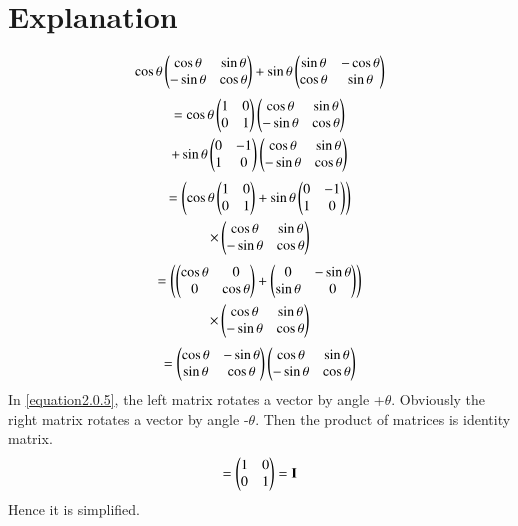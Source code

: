 \documentclass[journal,12pt,twocolumn]{IEEEtran}
\begin{document}
\section{\textbf{Explanation}}
\begin{align}
    \cos\theta\begin{pmatrix}\cos\theta & \sin\theta \\ -\sin\theta & \cos\theta\end{pmatrix}+\sin\theta\begin{pmatrix}\sin\theta & -\cos\theta \\ \cos\theta & \sin\theta\end{pmatrix}
\end{align}
\begin{multline}
    =\cos\theta\begin{pmatrix} 1 & 0 \\ 0 & 1\end{pmatrix}\begin{pmatrix}\cos\theta & \sin\theta \\ -\sin\theta & \cos\theta\end{pmatrix}\\+\sin\theta\begin{pmatrix} 0 & -1 \\ 1 & 0 \end{pmatrix}\begin{pmatrix}\cos\theta & \sin\theta \\ -\sin\theta & \cos\theta\end{pmatrix}
\end{multline}
\begin{multline}
    =\left(\cos\theta\begin{pmatrix} 1 & 0 \\ 0 & 1\end{pmatrix}+\sin\theta\begin{pmatrix} 0 & -1 \\ 1 & 0 \end{pmatrix}\right)\\\times\begin{pmatrix}\cos\theta & \sin\theta \\ -\sin\theta & \cos\theta\end{pmatrix}
\end{multline}
\begin{multline}
    =\left(\begin{pmatrix} \cos\theta & 0 \\ 0 & \cos\theta\end{pmatrix}+\begin{pmatrix} 0 & -\sin\theta \\ \sin\theta & 0 \end{pmatrix}\right)\\\times\begin{pmatrix}\cos\theta & \sin\theta \\ -\sin\theta & \cos\theta\end{pmatrix}
\end{multline}
\begin{align}\label{equation2.0.5}
    =\begin{pmatrix}\cos\theta & -\sin\theta \\ \sin\theta & \cos\theta\end{pmatrix}\begin{pmatrix}\cos\theta & \sin\theta \\ -\sin\theta & \cos\theta\end{pmatrix}
\end{align}
In \eqref{equation2.0.5}, the left matrix rotates a vector by angle +$\theta$. Obviously the right matrix rotates a vector by angle -$\theta$. Then the product of matrices is identity matrix.
\begin{align}
    =\begin{pmatrix} 1 & 0 \\ 0 & 1\end{pmatrix}=\mathbf{I}
\end{align}
Hence it is simplified.
\end{document}
